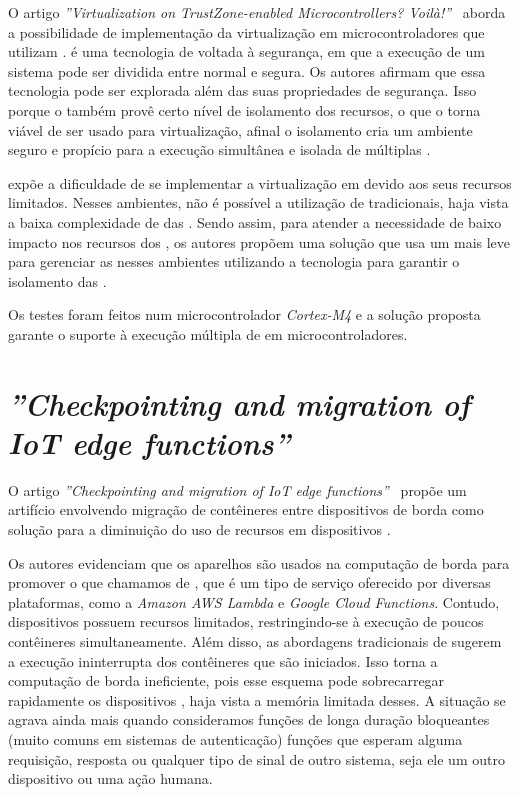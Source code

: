 O artigo \textit{''Virtualization on TrustZone-enabled Microcontrollers? Voilà!''}~\cite{pinto2019virtualization} aborda a possibilidade de implementação da virtualização em microcontroladores que utilizam \trustzone. \trustzone é uma tecnologia de \hardware voltada à segurança, em que a execução de um sistema pode ser dividida entre normal e segura. Os autores afirmam que essa tecnologia pode ser explorada além das suas propriedades de segurança. Isso porque o \trustzone também provê certo nível de isolamento dos recursos, o que o torna viável de ser usado para virtualização, afinal o isolamento cria um ambiente seguro e propício para a execução simultânea e isolada de múltiplas \vms.

 expõe a dificuldade de se implementar a virtualização em \mcus devido aos seus recursos limitados. Nesses ambientes, não é possível a utilização de \hypervisors tradicionais, haja vista a baixa complexidade de \hardware das \mcus. Sendo assim, para atender a necessidade de baixo impacto nos recursos dos \mcus, os autores propõem uma solução que usa um \hypervisor mais leve para gerenciar as \vms nesses ambientes utilizando a tecnologia \trustzone para garantir o isolamento das \vms.

Os testes foram feitos num microcontrolador \textit{Cortex-M4} e a solução proposta garante o suporte à execução múltipla de \vms em microcontroladores.

\section{\textit{''Checkpointing and migration of IoT edge functions''}}


O artigo \textit{''Checkpointing and migration of IoT edge functions''}~\cite{karhula2019checkpointing} propõe um artifício envolvendo migração de contêineres entre dispositivos \iot de borda como solução para a diminuição do uso de recursos em dispositivos \iot.

Os autores evidenciam que os aparelhos \iot são usados na computação de borda para promover o que chamamos de \faas, que é um tipo de serviço oferecido por diversas plataformas, como a \textit{Amazon AWS Lambda} e \textit{Google Cloud Functions}. Contudo, dispositivos \iot possuem recursos limitados, restringindo-se à execução de poucos contêineres simultaneamente. Além disso, as abordagens tradicionais de \faas sugerem a execução ininterrupta dos contêineres que são iniciados. Isso torna a computação de borda ineficiente, pois esse esquema pode sobrecarregar rapidamente os dispositivos \iot, haja vista a memória limitada desses. A situação se agrava ainda mais quando consideramos funções de longa duração bloqueantes (muito comuns em sistemas de autenticação) \eg funções que esperam alguma requisição, resposta ou qualquer tipo de sinal de outro sistema, seja ele um outro dispositivo \iot ou uma ação humana.

